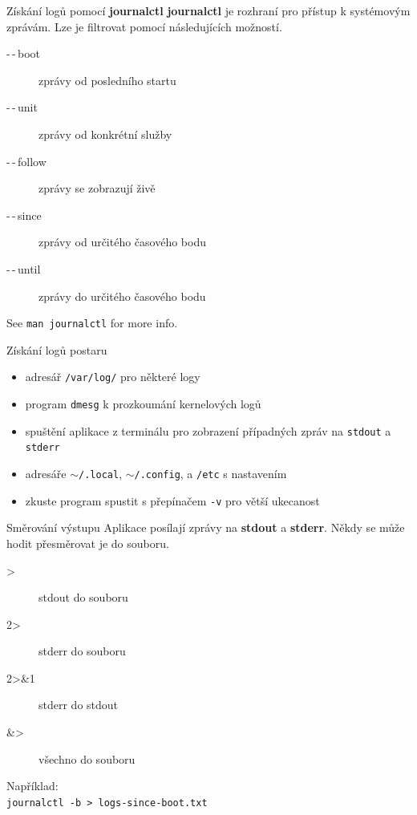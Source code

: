 \documentclass[12pt,aspectratio=169]{beamer}
\begin{document}
\begin{frame}[fragile]{Získání logů pomocí \textbf{journalctl}}
\textbf{journalctl} je rozhraní pro přístup k systémovým zprávám. Lze je filtrovat pomocí následujících možností.

\begin{description}
	\item[-\,-\,boot] zprávy od posledního startu
	\item[-\,-\,unit] zprávy od konkrétní služby
	\item[-\,-\,follow] zprávy se zobrazují živě
	\item[-\,-\,since] zprávy od určitého časového bodu
	\item[-\,-\,until] zprávy do určitého časového bodu
\end{description}

\vspace{5pt}

See {\color{blue}\texttt{man journalctl}} for more info.
\end{frame}

\begin{frame}{Získání logů postaru}
\begin{itemize}
	\item adresář {\color{blue} \texttt{/var/log/}} pro některé logy
	\item program {\color{blue} \texttt{dmesg}} k prozkoumání kernelových logů 
	\item spuštění aplikace z terminálu pro zobrazení případných zpráv na {\color{blue}\texttt{stdout}} a {\color{blue}\texttt{stderr}}
	\item adresáře {\color{blue} \texttt{$\sim$/.local}}, {\color{blue} \texttt{$\sim$/.config}}, a {\color{blue} \texttt{/etc}} s nastavením 
	\item zkuste program spustit s přepínačem {\color{blue} \texttt{-v}} pro větší ukecanost
\end{itemize}	
\end{frame}

\begin{frame}{Směrování výstupu}
Aplikace posílají zprávy na \textbf{stdout} a \textbf{stderr}. Někdy se může hodit přesměrovat je do souboru.
\begin{description}
	\item[>] stdout do souboru
	\item[2>] stderr do souboru
	\item[2>\&1] stderr do stdout
	\item[\&>] všechno do souboru
\end{description}

Například:\\ {\color{blue} \texttt{journalctl -b > logs-since-boot.txt}}

\end{frame}
\end{document}

